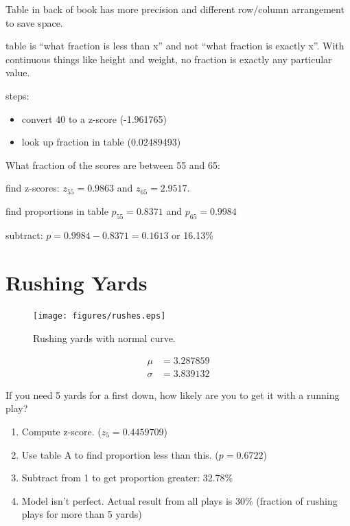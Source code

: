 \documentclass{exam}
\begin{document}
  \begin{itemize*}
    \item Table in back of book has more precision and different row/column
      arrangement to save space.
    \item table is ``what fraction is less than x'' and not ``what fraction is
      exactly x''.  With continuous things like height and weight, no fraction is
      exactly any particular value.
  \end{itemize*}

  steps:
  \begin{itemize}
    \item convert 40 to a z-score (-1.961765)
    \item look up fraction in table (0.02489493)
  \end{itemize}

  What fraction of the scores are between 55 and 65:
  \begin{itemize*}
    \item find z-scores: $z_{55} = 0.9863$ and $z_{65} = 2.9517$.
    \item find proportions in table $p_{55} = 0.8371$ and $p_{65} = 0.9984$
    \item subtract: $p = 0.9984 - 0.8371 = 0.1613$ or 16.13\%
  \end{itemize*}

  \section{Rushing Yards}

  \begin{figure}[H]
    \centering
    \texttt{[image: figures/rushes.eps]}
    \caption{Rushing yards with normal curve.}
  \end{figure}

  \begin{align*}
    \mu    & =3.287859 \\
    \sigma & = 3.839132
  \end{align*}

  If you need 5 yards for a first down, how likely are you to get it with a running
  play?

  \begin{enumerate}
    \item Compute z-score.  ($z_5 = 0.4459709$)

    \item Use table A to find proportion less than this. ($p = 0.6722$)

    \item Subtract from 1 to get proportion greater: 32.78\%

    \item Model isn't perfect.  Actual result from all plays is 30\% (fraction of
      rushing plays for more than 5 yards)

  \end{enumerate}
\end{document}

